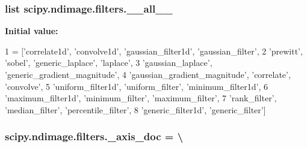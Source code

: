 \subsubsection[{\+\_\+\+\_\+all\+\_\+\+\_\+}]{\setlength{\rightskip}{0pt plus 5cm}list scipy.\+ndimage.\+filters.\+\_\+\+\_\+all\+\_\+\+\_\+}\label{namespacescipy_1_1ndimage_1_1filters_ac79030aaeea1d53c8b972f784ac66d06}
{\bfseries Initial value\+:}
\begin{DoxyCode}
1 = [\textcolor{stringliteral}{'correlate1d'}, \textcolor{stringliteral}{'convolve1d'}, \textcolor{stringliteral}{'gaussian\_filter1d'}, \textcolor{stringliteral}{'gaussian\_filter'},
2            \textcolor{stringliteral}{'prewitt'}, \textcolor{stringliteral}{'sobel'}, \textcolor{stringliteral}{'generic\_laplace'}, \textcolor{stringliteral}{'laplace'},
3            \textcolor{stringliteral}{'gaussian\_laplace'}, \textcolor{stringliteral}{'generic\_gradient\_magnitude'},
4            \textcolor{stringliteral}{'gaussian\_gradient\_magnitude'}, \textcolor{stringliteral}{'correlate'}, \textcolor{stringliteral}{'convolve'},
5            \textcolor{stringliteral}{'uniform\_filter1d'}, \textcolor{stringliteral}{'uniform\_filter'}, \textcolor{stringliteral}{'minimum\_filter1d'},
6            \textcolor{stringliteral}{'maximum\_filter1d'}, \textcolor{stringliteral}{'minimum\_filter'}, \textcolor{stringliteral}{'maximum\_filter'},
7            \textcolor{stringliteral}{'rank\_filter'}, \textcolor{stringliteral}{'median\_filter'}, \textcolor{stringliteral}{'percentile\_filter'},
8            \textcolor{stringliteral}{'generic\_filter1d'}, \textcolor{stringliteral}{'generic\_filter'}]
\end{DoxyCode}
\hypertarget{namespacescipy_1_1ndimage_1_1filters_ae52acf6c02c107c138569883c504a41a}{}
\subsubsection[{\+\_\+axis\+\_\+doc}]{\setlength{\rightskip}{0pt plus 5cm}scipy.\+ndimage.\+filters.\+\_\+axis\+\_\+doc = \textbackslash{}}\label{namespacescipy_1_1ndimage_1_1filters_ae52acf6c02c107c138569883c504a41a}
\hypertarget{namespacescipy_1_1ndimage_1_1filters_ac8ff6160df07471e0052d8b6415fe4d1}{}
